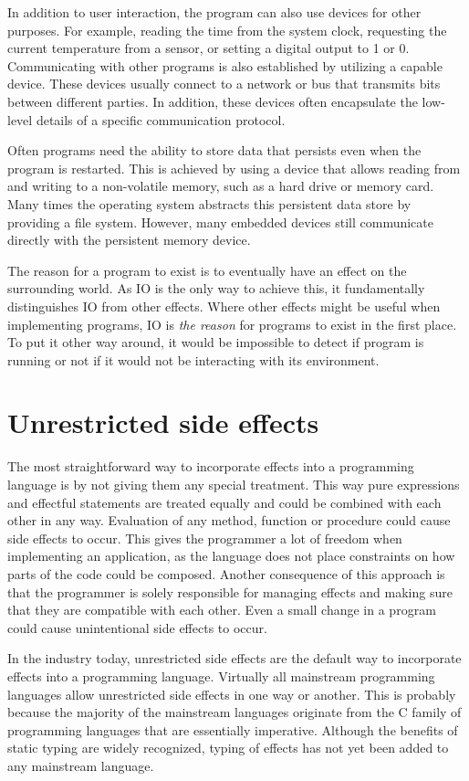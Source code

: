 In addition to user interaction, the program can also use devices for other purposes. For example, reading the time from the system clock, requesting the current temperature from a sensor, or setting a digital output to 1 or 0. Communicating with other programs is also established by utilizing a capable device. These devices usually connect to a network or bus that transmits bits between different parties. In addition, these devices often encapsulate the low-level details of a specific communication protocol.

Often programs need the ability to store data that persists even when the program is restarted. This is achieved by using a device that allows reading from and writing to a non-volatile memory, such as a hard drive or memory card. Many times the operating system abstracts this persistent data store by providing a file system. However, many embedded devices still communicate directly with the persistent memory device.

The reason for a program to exist is to eventually have an effect on the surrounding world. As IO is the only way to achieve this, it fundamentally distinguishes IO from other effects. Where other effects might be useful when implementing programs, IO is \textit{the reason} for programs to exist in the first place.~\cite{akward-squad} To put it other way around, it would be impossible to detect if program is running or not if it would not be interacting with its environment.


\section{Unrestricted side effects}
The most straightforward way to incorporate effects into a programming language is by not giving them any special treatment. This way pure expressions and effectful statements are treated equally and could be combined with each other in any way. Evaluation of any method, function or procedure could cause side effects to occur. This gives the programmer a lot of freedom when implementing an application, as the language does not place constraints on how parts of the code could be composed. Another consequence of this approach is that the programmer is solely responsible for managing effects and making sure that they are compatible with each other. Even a small change in a program could cause unintentional side effects to occur.

In the industry today, unrestricted side effects are the default way to incorporate effects into a programming language. Virtually all mainstream programming languages allow unrestricted side effects in one way or another. This is probably because the majority of the mainstream languages originate from the C family of programming languages that are essentially imperative. Although the benefits of static typing are widely recognized, typing of effects has not yet been added to any mainstream language.


